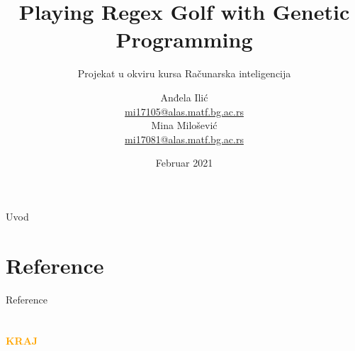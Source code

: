 \documentclass[aspectratio=43]{beamer}
\title[Regex Golf]{Playing Regex Golf with Genetic Programming}
\subtitle{Projekat u okviru kursa Računarska inteligencija}
\author[Anđela Ilić, Mina Milošević]{Anđela Ilić \\
\href{mailto:mi17105@alas.matf.bg.ac.rs}{mi17105@alas.matf.bg.ac.rs} \\
Mina Milošević \\
\href{mailto:mi17081@alas.matf.bg.ac.rs}{mi17081@alas.matf.bg.ac.rs} \\
}
\institute[MATF]{
    Matematički fakultet%
    \\%
    Univerzitet u Beogradu%
}
\date[Februar 2021]{Februar 2021}
\begin{document}
    
    \frame{\titlepage}
    
    \begin{frame}{Uvod}
        \tableofcontents
    \end{frame}

     
    
    
    
    \section*{Reference} 
        \nocite{Bartoli}
        \begin{frame}{Reference}
            \printbibliography
        \end{frame}

    \section{}
    \begin{frame}{}
        \centering
            \Huge\bfseries
        \textcolor{orange}{KRAJ}
    \end{frame}
\end{document}
